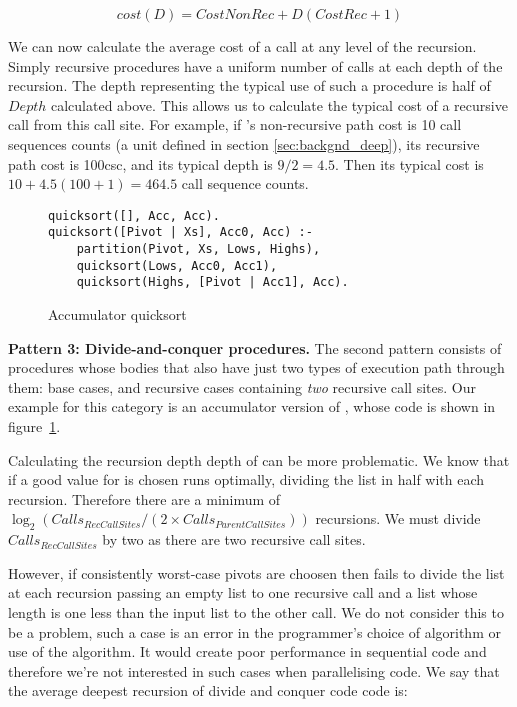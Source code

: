 \begin{equation*}
cost(D) = CostNonRec + D(CostRec + 1)
\end{equation*}

We can now calculate the average cost of a call at any level of the
recursion.
Simply recursive procedures have a uniform number of calls at each depth of
the recursion.
The depth representing the typical use of such a procedure is half of $Depth$
calculated above.
This allows us to calculate the typical cost of a recursive call from this
call site.
For example, if \mapfoldl's non-recursive path cost is 10 call sequences
counts (a unit defined in section \ref{sec:backgnd_deep}),
its recursive path cost is 100csc,
and its typical depth is $9/2 = 4.5$.
Then its typical cost is $10 + 4.5(100 + 1) = 464.5$ call sequence counts.

\begin{figure}[tb]
\begin{verbatim}
quicksort([], Acc, Acc).
quicksort([Pivot | Xs], Acc0, Acc) :-
    partition(Pivot, Xs, Lows, Highs),
    quicksort(Lows, Acc0, Acc1),
    quicksort(Highs, [Pivot | Acc1], Acc).
\end{verbatim}
\caption{Accumulator quicksort}
\label{fig:quicksort_acc}
\end{figure}

{\bf Pattern 3: Divide-and-conquer procedures.}
The second pattern consists of procedures whose bodies
that also have just two types of execution path through them:
base cases, and recursive cases containing \emph{two} recursive call sites.
Our example for this category is an accumulator version of \quicksortacc,
whose code is shown in figure~\ref{fig:quicksort_acc}.

Calculating the recursion depth depth of \quicksortacc can be more
problematic.
We know that if a good value for  is chosen \quicksortacc runs
optimally,
dividing the list in half with each recursion.
Therefore there are a minimum of
$\log_2 (Calls_{RecCallSites} / (2 \times Calls_{ParentCallSites}))$ recursions.
We must divide $Calls_{RecCallSites}$ by two as there are two recursive call
sites.

However,
if consistently worst-case pivots are choosen then \quicksortacc fails to
divide the list at each recursion passing an empty list to one recursive call
and a list whose length is one less than the input list to the other call.
We do not consider this to be a problem,
such a case is an error in the programmer's choice of algorithm or use of the
algorithm.
It would create poor performance in sequential code and therefore we're not
interested in such cases when parallelising code.
We say that the average deepest recursion of divide and conquer code code is:

